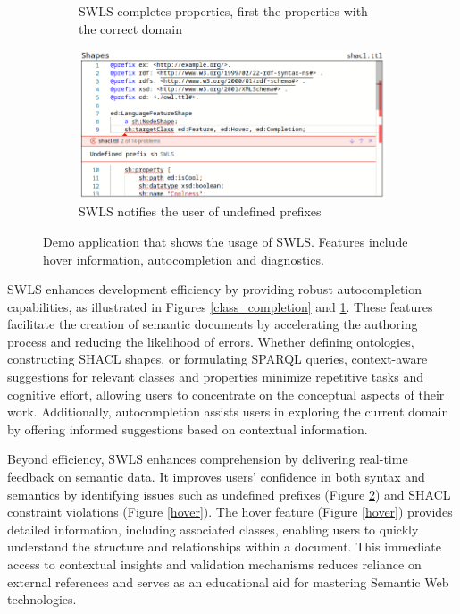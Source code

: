 \begin{figure}[tb]
\begin{subfigure}{0.48\textwidth}
      \caption{SWLS completes properties, first the properties with the correct domain}
      \label{property_completion}
    \end{subfigure}
    \hfill
    \begin{subfigure}{0.48\textwidth}
      \includegraphics[width=\textwidth]{./images/undefined.png}
      \caption{SWLS notifies the user of undefined prefixes}
      \label{undefined_prefix}
    \end{subfigure}
    \caption{
      Demo application that shows the usage of SWLS. Features include hover information, autocompletion and diagnostics.
    }\label{lst:Demo}
\end{figure}

SWLS enhances development efficiency by providing robust autocompletion capabilities, as illustrated in Figures \ref{class_completion} and \ref{property_completion}.
These features facilitate the creation of semantic documents by accelerating the authoring process and reducing the likelihood of errors.
Whether defining ontologies, constructing SHACL shapes, or formulating SPARQL queries, context-aware suggestions for relevant classes and properties minimize repetitive tasks and cognitive effort, allowing users to concentrate on the conceptual aspects of their work.
Additionally, autocompletion assists users in exploring the current domain by offering informed suggestions based on contextual information.

Beyond efficiency, SWLS enhances comprehension by delivering real-time feedback on semantic data.
It improves users' confidence in both syntax and semantics by identifying issues such as undefined prefixes (Figure \ref{undefined_prefix}) and SHACL constraint violations (Figure \ref{hover}).
The hover feature (Figure \ref{hover}) provides detailed information, including associated classes, enabling users to quickly understand the structure and relationships within a document.
This immediate access to contextual insights and validation mechanisms reduces reliance on external references and serves as an educational aid for mastering Semantic Web technologies.


